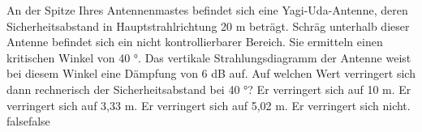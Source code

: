     {An der Spitze Ihres Antennenmastes befindet sich eine Yagi-Uda-Antenne, deren Sicherheitsabstand in Hauptstrahlrichtung 20 m beträgt. Schräg unterhalb dieser Antenne befindet sich ein nicht kontrollierbarer Bereich. Sie ermitteln einen kritischen Winkel von 40 °. Das vertikale Strahlungsdiagramm der Antenne weist bei diesem Winkel eine Dämpfung von 6 dB auf. Auf welchen Wert verringert sich dann rechnerisch der Sicherheitsabstand bei 40 °?}
    {Er verringert sich auf 10 m.}
    {Er verringert sich auf 3,33 m.}
    {Er verringert sich auf 5,02 m.}
    {Er verringert sich nicht.}
    {false}{false}